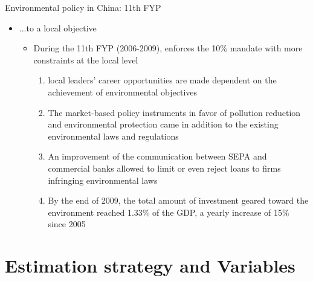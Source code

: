 \documentclass{beamer}
\begin{document}
\begin{frame}{Environmental policy in China: 11th FYP}
    \begin{itemize}
        \item ...to a local objective
            \begin{itemize}
                \item   During the 11th FYP (2006-2009), enforces the 10\% mandate with more constraints at the local level
            \begin{enumerate}
                \item local leaders’ career opportunities are made dependent on the achievement of environmental objectives
                \item The market-based policy instruments in favor of pollution reduction and environmental protection came in addition to the existing environmental laws and regulations
                \item  An improvement of the communication between SEPA and commercial banks allowed to limit or even reject loans to firms infringing environmental laws
                \item By the end of 2009, the total amount of investment geared toward the environment reached 1.33\% of the GDP, a yearly increase of 15\% since 2005
            \end{enumerate}
        \end{itemize}
    \end{itemize}
\end{frame}

\section{Estimation strategy and Variables}
\end{document}
